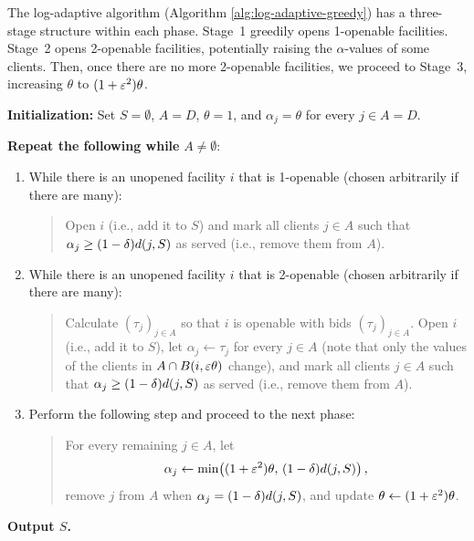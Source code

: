 The log-adaptive algorithm (Algorithm \ref{alg:log-adaptive-greedy}) has a three-stage structure within each phase. Stage~1 greedily opens 1-openable facilities. Stage~2 opens 2-openable facilities, potentially raising the $\alpha$-values of some clients. Then, once there are no more 2-openable facilities, we proceed to Stage~3, increasing $\theta$ to $(1+\varepsilon^2)\theta$.

\begin{algorithm}[H]
    \caption{Log-Adaptive Algorithm}
    \label{alg:log-adaptive-greedy}
    \textbf{Initialization:} Set $S = \emptyset$, $A = D$, $\theta = 1$, and
    $\alpha_j = \theta$ for every $j \in A = D$.

    \textbf{Repeat the following while} $A \neq \emptyset$:
              \begin{enumerate}
                  \item While there is an unopened facility $i$ that is 1-openable (chosen arbitrarily if there are many):
                        \begin{quote}
                            Open $i$ (i.e., add it to $S$) and mark all
                            clients $j \in A$ such that $\alpha_j \geq (1-\delta)d(j,S)$ as served
                            (i.e., remove them from $A$).
                        \end{quote}
                  \item While there is an unopened facility $i$ that is 2-openable (chosen arbitrarily if there are many):
                        \begin{quote}
                            Calculate $(\tau_j)_{j\in A}$ so that $i$ is openable with bids $(\tau_j)_{j\in A}$.
                            Open $i$ (i.e., add it to $S$), let $\alpha_j \leftarrow \tau_j$ for every $j \in A$
                            (note that only the values of the clients in $A \cap B(i,\varepsilon\theta)$ change), and mark all
                            clients $j \in A$ such that $\alpha_j \geq (1-\delta)d(j,S)$ as served
                            (i.e., remove them from $A$).
                        \end{quote}
                  \item Perform the following step and proceed to the next phase:
                        \begin{quote}
                            For every remaining $j \in A$, let
                            \[
                                \alpha_j \leftarrow \min\bigl((1+\varepsilon^2)\theta,\,(1-\delta)d(j,S)\bigr)\,,
                            \]
                            remove $j$ from $A$ when $\alpha_j = (1-\delta)d(j,S)$, and update
                            $\theta \leftarrow (1+\varepsilon^2)\theta$.
                        \end{quote}
              \end{enumerate}
    \textbf{Output $S$.}
\end{algorithm}

